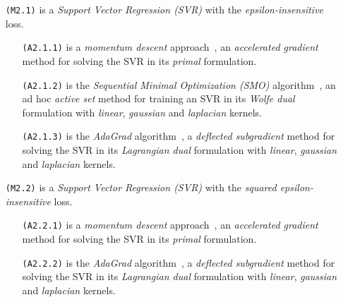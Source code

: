 \bigskip

\begin{itemize}
\item[\texttt{(M2.1)}] is a \emph{Support Vector Regression (SVR)} with the \emph{epsilon-insensitive} loss.

\begin{itemize}
\item[\texttt{(A2.1.1)}] is a \emph{momentum descent} approach~\cite{polyak1964some, nesterov1998introductory, nesterov1983method}, an \emph{accelerated gradient} method for solving the SVR in its \emph{primal} formulation.

\item[\texttt{(A2.1.2)}] is the \emph{Sequential Minimal Optimization (SMO)} algorithm~\cite{flake2002efficient, shevade1999improvements}, an ad hoc \emph{active set} method for training an SVR in its \emph{Wolfe dual} formulation with \emph{linear}, \emph{gaussian} and \emph{laplacian} kernels.

\item[\texttt{(A2.1.3)}] is the \emph{AdaGrad} algorithm~\cite{duchi2011adaptive}, a \emph{deflected subgradient} method for solving the SVR in its \emph{Lagrangian dual} formulation with \emph{linear}, \emph{gaussian} and \emph{laplacian} kernels.
\end{itemize}

\end{itemize}

\begin{itemize}
\item[\texttt{(M2.2)}] is a \emph{Support Vector Regression (SVR)} with the \emph{squared epsilon-insensitive} loss.

\begin{itemize}
\item[\texttt{(A2.2.1)}] is a \emph{momentum descent} approach~\cite{polyak1964some, nesterov1998introductory, nesterov1983method}, an \emph{accelerated gradient} method for solving the SVR in its \emph{primal} formulation.

\item[\texttt{(A2.2.2)}] is the \emph{AdaGrad} algorithm~\cite{duchi2011adaptive}, a \emph{deflected subgradient} method for solving the SVR in its \emph{Lagrangian dual} formulation with \emph{linear}, \emph{gaussian} and \emph{laplacian} kernels.
\end{itemize}

\end{itemize}